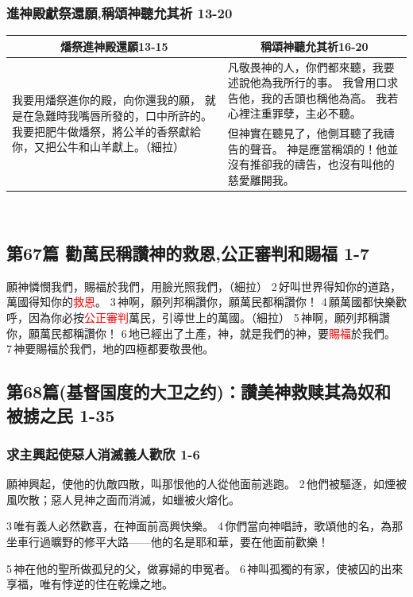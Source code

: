 \subsubsection{進神殿獻祭還願,稱頌神聽允其祈 13-20}
\begin{table}[H]
\centering
\begin{tabular}{p{6.25cm}|p{}}\hline\hline
\multicolumn{1}{c|}{燔祭進神殿還願13-15}&\multicolumn{1}{c}{稱頌神聽允其祈16-20}\\\hline
\multirow{2}{6.3cm}{我要用燔祭進你的殿，向你還我的願，
就是在急難時我嘴唇所發的，口中所許的。
我要把肥牛做燔祭，將公羊的香祭獻給你，又把公牛和山羊獻上。（細拉）}
&凡敬畏神的人，你們都來聽，我要述說他為我所行的事。
我曾用口求告他，我的舌頭也稱他為高。
我若心裡注重罪孽，主必不聽。\\\cline{2-2}
&但神實在聽見了，他側耳聽了我禱告的聲音。
神是應當稱頌的！他並沒有推卻我的禱告，也沒有叫他的慈愛離開我。\\\hline
\end{tabular}
\end{table} 

\subsection{第67篇 勸萬民稱讚神的救恩,公正審判和賜福 1-7}
願神憐憫我們，賜福於我們，用臉光照我們，（細拉）
2 好叫世界得知你的道路，萬國得知你的\textcolor{red}{救恩}。
3 神啊，願列邦稱讚你，願萬民都稱讚你！
4 願萬國都快樂歡呼，因為你必按\textcolor{red}{公正審判}萬民，引導世上的萬國。（細拉）
5 神啊，願列邦稱讚你，願萬民都稱讚你！
6 地已經出了土產，神，就是我們的神，要\textcolor{red}{賜福}於我們。
7 神要賜福於我們，地的四極都要敬畏他。

\subsection{第68篇(基督国度的大卫之约)：讚美神救赎其為奴和被掳之民 1-35}
\subsubsection{求主興起使惡人消滅義人歡欣 1-6}
願神興起，使他的仇敵四散，叫那恨他的人從他面前逃跑。
2 他們被驅逐，如煙被風吹散；惡人見神之面而消滅，如蠟被火熔化。

3 唯有義人必然歡喜，在神面前高興快樂。
4 你們當向神唱詩，歌頌他的名，為那坐車行過曠野的修平大路——他的名是耶和華，要在他面前歡樂！

5 神在他的聖所做孤兒的父，做寡婦的申冤者。
6 神叫孤獨的有家，使被囚的出來享福，唯有悖逆的住在乾燥之地。

